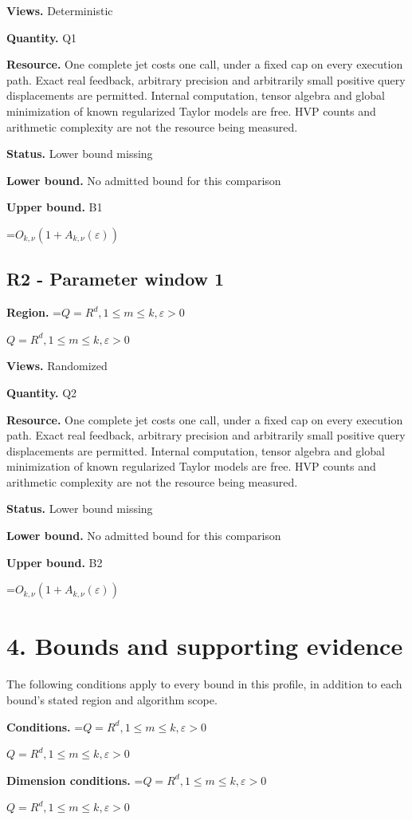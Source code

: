 \documentclass[10pt,a4paper]{article}
\newcommand{\AtlasMath}[1]{\par\begingroup\centering\setbox0=\hbox{$\displaystyle #1$}\ifdim\wd0>1.4\linewidth\typeout{ATLAS WIDE FORMULA: \the\wd0}\fi\ifdim\wd0>\linewidth\resizebox{\linewidth}{!}{\box0}\else\box0\fi\par\endgroup}
\newcommand{\AtlasInlineMath}[1]{\begingroup\setbox0=\hbox{$#1$}\ifdim\wd0>.4\linewidth\endgroup\AtlasMath{#1}\else\endgroup$#1$\fi}
\begin{document}
\textbf{Views.} Deterministic

\textbf{Quantity.} Q1

\textbf{Resource.} One complete jet costs one call, under a fixed cap on every execution path. Exact real feedback, arbitrary precision and arbitrarily small positive query displacements are permitted. Internal computation, tensor algebra and global minimization of known regularized Taylor models are free. HVP counts and arithmetic complexity are not the resource being measured.

\textbf{Status.} Lower bound missing

\textbf{Lower bound.} No admitted bound for this comparison

\textbf{Upper bound.} B1

\AtlasMath{O_{k,\nu}(1+A_{k,\nu}(\varepsilon))}
\subsection{R2 - Parameter window 1}
\textbf{Region.} \AtlasInlineMath{Q=R^d,1\le m\le k,\varepsilon>0}

\textbf{Views.} Randomized

\textbf{Quantity.} Q2

\textbf{Resource.} One complete jet costs one call, under a fixed cap on every execution path. Exact real feedback, arbitrary precision and arbitrarily small positive query displacements are permitted. Internal computation, tensor algebra and global minimization of known regularized Taylor models are free. HVP counts and arithmetic complexity are not the resource being measured.

\textbf{Status.} Lower bound missing

\textbf{Lower bound.} No admitted bound for this comparison

\textbf{Upper bound.} B2

\AtlasMath{O_{k,\nu}(1+A_{k,\nu}(\varepsilon))}
\section{4. Bounds and supporting evidence}
The following conditions apply to every bound in this profile, in addition to each bound's stated region and algorithm scope.

\textbf{Conditions.} \AtlasInlineMath{Q=R^d,1\le m\le k,\varepsilon>0}

\textbf{Dimension conditions.} \AtlasInlineMath{Q=R^d,1\le m\le k,\varepsilon>0}
\end{document}
